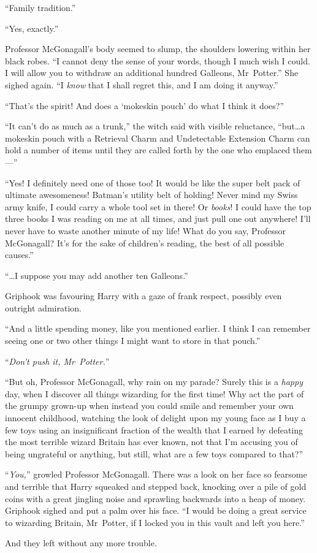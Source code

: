 “Family tradition.”

“Yes, exactly.”

Professor McGonagall’s body seemed to slump, the shoulders lowering within her black robes.
“I cannot deny the sense of your words, though I much wish I could. I will allow you to withdraw an additional hundred Galleons, Mr~Potter.” She sighed again.
“I \emph{know} that I shall regret this, and I am doing it anyway.”

“That’s the spirit! And does a ‘mokeskin pouch’ do what I think it does?”

“It can’t do as much as a trunk,” the witch said with visible reluctance, “but…a mokeskin pouch with a Retrieval Charm and Undetectable Extension Charm can hold a number of items until they are called forth by the one who emplaced them—”

“Yes! I definitely need one of those too! It would be like the super belt pack of ultimate awesomeness! Batman’s utility belt of holding! Never mind my Swiss army knife, I could carry a whole tool set in there! Or \emph{books}! I could have the top three books I was reading on me at all times, and just pull one out anywhere! I’ll never have to waste another minute of my life! What do you say, Professor McGonagall? It’s for the sake of children’s reading, the best of all possible causes.”

“…I suppose you may add another ten Galleons.”

Griphook was favouring Harry with a gaze of frank respect, possibly even outright admiration.

“And a little spending money, like you mentioned earlier. I think I can remember seeing one or two other things I might want to store in that pouch.”

“\emph{Don’t push it, Mr~Potter.}”

“But oh, Professor McGonagall, why rain on my parade? Surely this is a \emph{happy} day, when I discover all things wizarding for the first time! Why act the part of the grumpy grown-up when instead you could smile and remember your own innocent childhood, watching the look of delight upon my young face as I buy a few toys using an insignificant fraction of the wealth that I earned by defeating the most terrible wizard Britain has ever known, not that I’m accusing you of being ungrateful or anything, but still, what are a few toys compared to that?”

“\emph{You,}” growled Professor McGonagall. There was a look on her face so fearsome and terrible that Harry squeaked and stepped back, knocking over a pile of gold coins with a great jingling noise and sprawling backwards into a heap of money. Griphook sighed and put a palm over his face.
“I would be doing a great service to wizarding Britain, Mr~Potter, if I locked you in this vault and left you here.”

And they left without any more trouble.

